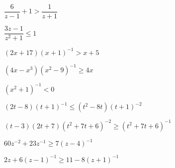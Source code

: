 \documentclass{ximera}
\begin{document}
\begin{question}
\begin{problem}
$\dfrac{6}{z-1} + 1 > \dfrac{1}{z+1}$
\end{problem}  

\begin{problem}
$\dfrac{3z - 1}{z^{2} + 1} \leq 1$
\end{problem}

\begin{problem}
$(2x+17)(x+1)^{-1} > x + 5$
\end{problem} 

\begin{problem}
$(4x-x^3)(x^{2} - 9)^{-1} \geq 4x$
\end{problem} 

\begin{problem}
$(x^{2} + 1)^{-1} < 0$
\end{problem}  

\begin{problem}
$(2t-8)(t+1)^{-1} \leq (t^2-8t)(t+1)^{-2}$ %
\end{problem}  

\begin{problem}
$(t-3)(2t+7)(t^2+7t+6)^{-2} \geq (t^2+7t+6)^{-1}$ %
\end{problem} 

\begin{problem}
$60z^{-2}+23z^{-1} \geq 7(z-4)^{-1}$
\end{problem} 

\begin{problem}\label{ratlineqexerciselast}
$2z+6(z-1)^{-1} \geq 11 - 8(z+1)^{-1}$
\end{problem}  
\end{question}
\end{document}
